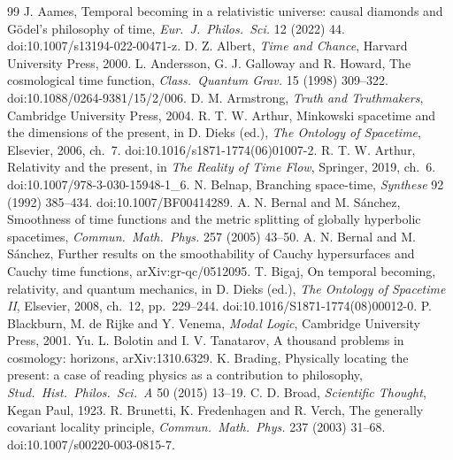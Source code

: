 \documentclass[11pt]{article}
\theoremstyle{definition}
\begin{document}
\begin{thebibliography}{99}
 J. Aames, Temporal becoming in a relativistic universe: causal diamonds and Gödel's philosophy of time, \emph{Eur.\ J.\ Philos.\ Sci.} 12 (2022) 44. doi:10.1007/s13194-022-00471-z.
 D. Z. Albert, \emph{Time and Chance}, Harvard University Press, 2000.
 L. Andersson, G. J. Galloway and R. Howard, The cosmological time function, \emph{Class.\ Quantum Grav.} 15 (1998) 309--322. doi:10.1088/0264-9381/15/2/006.
 D. M. Armstrong, \emph{Truth and Truthmakers}, Cambridge University Press, 2004.
 R. T. W. Arthur, Minkowski spacetime and the dimensions of the present, in D. Dieks (ed.), \emph{The Ontology of Spacetime}, Elsevier, 2006, ch.~7. doi:10.1016/s1871-1774(06)01007-2.
 R. T. W. Arthur, Relativity and the present, in \emph{The Reality of Time Flow}, Springer, 2019, ch.~6. doi:10.1007/978-3-030-15948-1\_6.
 N. Belnap, Branching space-time, \emph{Synthese} 92 (1992) 385--434. doi:10.1007/BF00414289.
 A. N. Bernal and M. Sánchez, Smoothness of time functions and the metric splitting of globally hyperbolic spacetimes, \emph{Commun.\ Math.\ Phys.} 257 (2005) 43--50.
 A. N. Bernal and M. Sánchez, Further results on the smoothability of Cauchy hypersurfaces and Cauchy time functions, arXiv:gr-qc/0512095.
 T. Bigaj, On temporal becoming, relativity, and quantum mechanics, in D. Dieks (ed.), \emph{The Ontology of Spacetime II}, Elsevier, 2008, ch.~12, pp.~229--244. doi:10.1016/S1871-1774(08)00012-0.
 P. Blackburn, M. de Rijke and Y. Venema, \emph{Modal Logic}, Cambridge University Press, 2001.
 Yu. L. Bolotin and I. V. Tanatarov, A thousand problems in cosmology: horizons, arXiv:1310.6329.
 K. Brading, Physically locating the present: a case of reading physics as a contribution to philosophy, \emph{Stud.\ Hist.\ Philos.\ Sci.\ A} 50 (2015) 13--19.
 C. D. Broad, \emph{Scientific Thought}, Kegan Paul, 1923.
 R. Brunetti, K. Fredenhagen and R. Verch, The generally covariant locality principle, \emph{Commun.\ Math.\ Phys.} 237 (2003) 31--68. doi:10.1007/s00220-003-0815-7.

\end{thebibliography}
\end{document}
